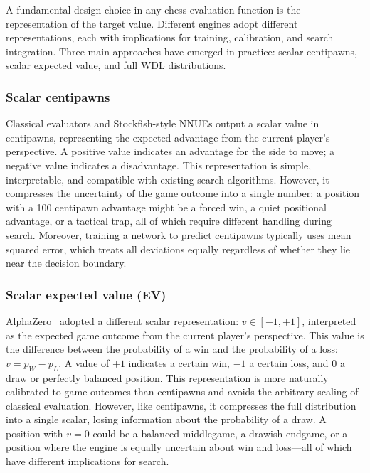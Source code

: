 A fundamental design choice in any chess evaluation function is the representation of the target value. Different engines adopt different representations, each with implications for training, calibration, and search integration. Three main approaches have emerged in practice: scalar centipawns, scalar expected value, and full WDL distributions.

\subsubsection{Scalar centipawns}\label{sec:centipawns}

Classical evaluators and Stockfish-style NNUEs output a scalar value in centipawns, representing the expected advantage from the current player's perspective. A positive value indicates an advantage for the side to move; a negative value indicates a disadvantage. This representation is simple, interpretable, and compatible with existing search algorithms. However, it compresses the uncertainty of the game outcome into a single number: a position with a 100 centipawn advantage might be a forced win, a quiet positional advantage, or a tactical trap, all of which require different handling during search. Moreover, training a network to predict centipawns typically uses mean squared error, which treats all deviations equally regardless of whether they lie near the decision boundary.

\subsubsection{Scalar expected value (EV)}\label{sec:ev}

AlphaZero~\cite{silver2018alphazero} adopted a different scalar representation: \(v \in [-1, +1]\), interpreted as the expected game outcome from the current player's perspective. This value is the difference between the probability of a win and the probability of a loss: \(v = p_W - p_L\). A value of \(+1\) indicates a certain win, \(-1\) a certain loss, and \(0\) a draw or perfectly balanced position. This representation is more naturally calibrated to game outcomes than centipawns and avoids the arbitrary scaling of classical evaluation. However, like centipawns, it compresses the full distribution into a single scalar, losing information about the probability of a draw. A position with \(v = 0\) could be a balanced middlegame, a drawish endgame, or a position where the engine is equally uncertain about win and loss---all of which have different implications for search.

